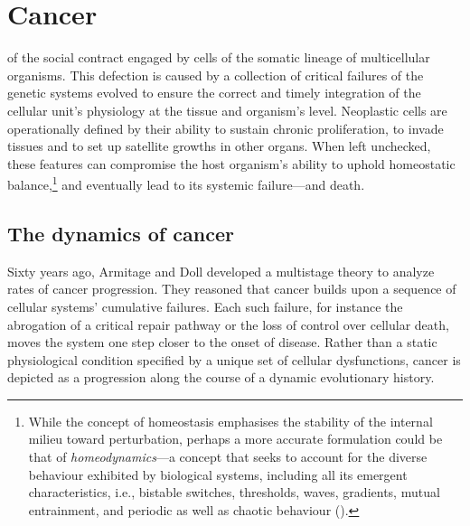 \section{Cancer}


 of the social contract engaged by cells of the
somatic lineage of multicellular organisms.  This defection is caused by a
collection of critical failures of the genetic systems evolved to ensure the
correct and timely integration of the cellular unit's physiology at the tissue
and organism's level.  Neoplastic cells are operationally defined by their
ability to sustain chronic proliferation, to invade tissues and to set up
satellite growths in other organs.  When left unchecked, these features can
compromise the host organism's ability to uphold homeostatic
balance,\footnote{While the concept of homeostasis emphasises the stability of
  the internal milieu toward perturbation, perhaps a more accurate formulation
  could be that of \mbox{\emph{homeodynamics}}---a concept that seeks to account
  for the diverse behaviour exhibited by biological systems, including all its
  emergent characteristics, i.e., bistable switches, thresholds, waves,
  gradients, mutual entrainment, and periodic as well as chaotic behaviour
  (\citealp{lloyd_why_2001}).} and eventually lead to its systemic failure---and
death.

\bigskip



\subsection{The dynamics of cancer}
\label{sec:dynamics-cancer}

Sixty years ago, Armitage and Doll developed a multistage theory to analyze
rates of cancer progression.\cite{armitage_age_1954} They reasoned that cancer
builds upon a sequence of cellular systems' cumulative failures.  Each such
failure, for instance the abrogation of a critical  repair
pathway or the loss of control over cellular death, moves the system one step
closer to the onset of disease.\cite{frank_dynamics_2007} Rather than a static
physiological condition specified by a unique set of cellular dysfunctions,
cancer is depicted as a progression along the course of a dynamic evolutionary
history.

